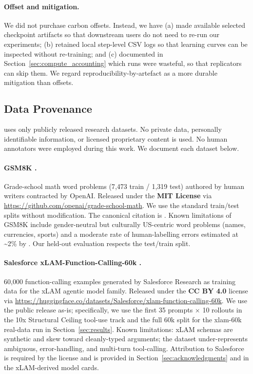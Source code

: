 \paragraph{Offset and mitigation.}
We did not purchase carbon offsets. Instead, we have (a) made available selected
checkpoint artifacts so that downstream users do not
need to re-run our experiments; (b) retained local step-level CSV logs so that
learning curves can be inspected without re-training; and (c) documented
in Section~\ref{sec:compute_accounting} which runs were wasteful, so that
replicators can skip them. We regard reproducibility-by-artefact as a
more durable mitigation than offsets.

\subsection{Data Provenance}
\label{sec:provenance}

\ours{} uses only publicly released research datasets. No private data,
personally identifiable information, or licensed proprietary content is
used. No human annotators were employed during this work. We document
each dataset below.

\paragraph{GSM8K \cite{cobbe2021training}.}
Grade-school math word problems (7{,}473 train / 1{,}319 test)
authored by human writers contracted by OpenAI. Released under the
\textbf{MIT License} via \url{https://github.com/openai/grade-school-math}.
We use the standard train/test splits without modification. The canonical
citation is \citet{cobbe2021training}. Known limitations of GSM8K include
gender-neutral but culturally US-centric word problems (names, currencies,
sports) and a moderate rate of human-labelling errors estimated at
\textasciitilde 2\% by \cite{zhang2024gsm1k}. Our held-out evaluation
respects the test/train split.

\paragraph{Salesforce xLAM-Function-Calling-60k \cite{liu2024xlam}.}
60{,}000 function-calling examples generated by Salesforce Research as
training data for the xLAM agentic model family. Released under the
\textbf{CC BY 4.0} license via \url{https://huggingface.co/datasets/Salesforce/xlam-function-calling-60k}.
We use the public release as-is; specifically, we use the first 35 prompts
$\times$ 10 rollouts in the 10x Structural Ceiling tool-use track and the
full 60k split for the xlam-60k real-data run in Section~\ref{sec:results}.
Known limitations: xLAM schemas are synthetic and skew toward cleanly-typed
arguments; the dataset under-represents ambiguous, error-handling, and
multi-turn tool-calling. Attribution to Salesforce is required by the
license and is provided in Section~\ref{sec:acknowledgments} and in the
xLAM-derived model cards.

